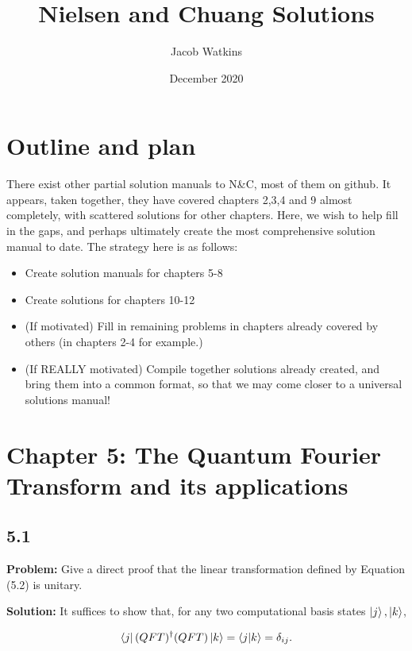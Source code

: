 \documentclass{article}
\title{Nielsen and Chuang Solutions}
\author{Jacob Watkins}
\date{December 2020}
\begin{document}
\maketitle
\section{Outline and plan}
There exist other partial solution manuals to N\&C, most of them on github. It appears, taken together, they have covered chapters 2,3,4 and 9 almost completely, with scattered solutions for other chapters. Here, we wish to help fill in the gaps, and perhaps ultimately create the most comprehensive solution manual to date. The strategy here is as follows:
\begin{itemize}
    \item Create solution manuals for chapters 5-8
    \item Create solutions for chapters 10-12
    \item (If motivated) Fill in remaining problems in chapters already covered by others (in chapters 2-4 for example.)
    \item (If REALLY motivated) Compile together solutions already created, and bring them into a common format, so that we may come closer to a universal solutions manual!
\end{itemize}

\section*{Chapter 5: The Quantum Fourier Transform and its applications}

\subsection*{5.1}
\textbf{Problem:} Give a direct proof that the linear transformation defined by Equation (5.2) is unitary.

\textbf{Solution:} It suffices to show that, for any two computational basis states $\ket{j}, \ket{k}$,

\begin{align} \label{eq:5.1:QFT_unitary}
    \bra{j}(QFT)^\dagger(QFT)\ket{k} = \braket{j}{k} = \delta_{ij}.
\end{align}
\end{document}
